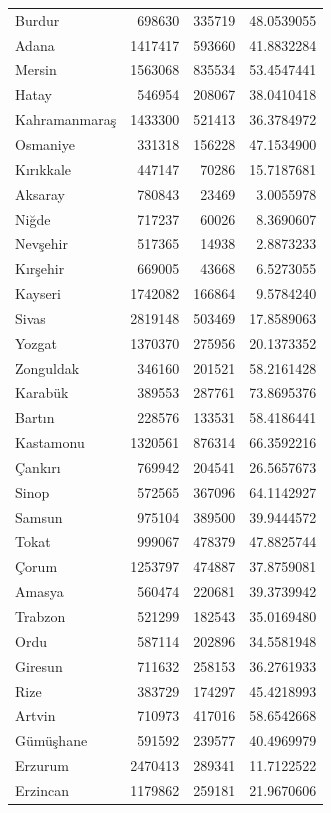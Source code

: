 \documentclass[
  11pt,
  a4paper,
  DIV=11,
  numbers=noendperiod]{scrartcl}
\begin{document}
{\begin{longtable}[]{@{}lrrr@{}}
Burdur & 698630 & 335719 & 48.0539055 \\
Adana & 1417417 & 593660 & 41.8832284 \\
Mersin & 1563068 & 835534 & 53.4547441 \\
Hatay & 546954 & 208067 & 38.0410418 \\
Kahramanmaraş & 1433300 & 521413 & 36.3784972 \\
Osmaniye & 331318 & 156228 & 47.1534900 \\
Kırıkkale & 447147 & 70286 & 15.7187681 \\
Aksaray & 780843 & 23469 & 3.0055978 \\
Niğde & 717237 & 60026 & 8.3690607 \\
Nevşehir & 517365 & 14938 & 2.8873233 \\
Kırşehir & 669005 & 43668 & 6.5273055 \\
Kayseri & 1742082 & 166864 & 9.5784240 \\
Sivas & 2819148 & 503469 & 17.8589063 \\
Yozgat & 1370370 & 275956 & 20.1373352 \\
Zonguldak & 346160 & 201521 & 58.2161428 \\
Karabük & 389553 & 287761 & 73.8695376 \\
Bartın & 228576 & 133531 & 58.4186441 \\
Kastamonu & 1320561 & 876314 & 66.3592216 \\
Çankırı & 769942 & 204541 & 26.5657673 \\
Sinop & 572565 & 367096 & 64.1142927 \\
Samsun & 975104 & 389500 & 39.9444572 \\
Tokat & 999067 & 478379 & 47.8825744 \\
Çorum & 1253797 & 474887 & 37.8759081 \\
Amasya & 560474 & 220681 & 39.3739942 \\
Trabzon & 521299 & 182543 & 35.0169480 \\
Ordu & 587114 & 202896 & 34.5581948 \\
Giresun & 711632 & 258153 & 36.2761933 \\
Rize & 383729 & 174297 & 45.4218993 \\
Artvin & 710973 & 417016 & 58.6542668 \\
Gümüşhane & 591592 & 239577 & 40.4969979 \\
Erzurum & 2470413 & 289341 & 11.7122522 \\
Erzincan & 1179862 & 259181 & 21.9670606 \\

\end{longtable}}
\end{document}
